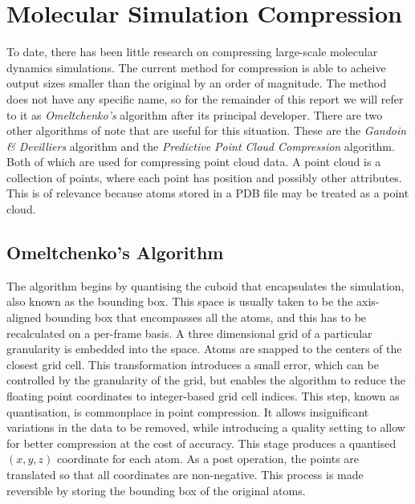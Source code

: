 \documentclass[a4paper,11pt]{report}
\begin{document}
\section{Molecular Simulation Compression}
\label{back_msc}
To date, there has been little research on compressing large-scale molecular dynamics simulations. The current method\cite{RefWorks:3} for compression is able to acheive output sizes smaller than the original by an order of magnitude. The method does not have any specific name, so for the remainder of this report we will refer to it as \emph{Omeltchenko's} algorithm after its principal developer. There are two other algorithms of note that are useful for this situation. These are the \emph{Gandoin \& Devilliers} algorithm\cite{devillers2000gci} and the \emph{Predictive Point Cloud Compression} algorithm\cite{gumholdcomp}. Both of which are used for compressing point cloud data. A point cloud is a collection of points, where each point has position and possibly other attributes. This is of relevance because atoms stored in a PDB file may be treated as a point cloud.

\subsection{Omeltchenko's Algorithm}
\label{bgomel}

The algorithm begins by quantising the cuboid that encapsulates the simulation, also known as the bounding box. This space is usually taken to be the axis-aligned bounding box that encompasses all the atoms, and this has to be recalculated on a per-frame basis. A three dimensional grid of a particular granularity is embedded into the space. Atoms are snapped to the centers of the closest grid cell. This transformation introduces a small error, which can be controlled by the granularity of the grid, but enables the algorithm to reduce the floating point coordinates to integer-based grid cell indices. This step, known as quantisation, is commonplace in point compression. It allows insignificant variations in the data to be removed, while introducing a quality setting to allow for better compression at the cost of accuracy. This stage produces a quantised $(x, y, z)$ coordinate for each atom. As a post operation, the points are translated so that all coordinates are non-negative. This process is made reversible by storing the bounding box of the original atoms.
\end{document}
